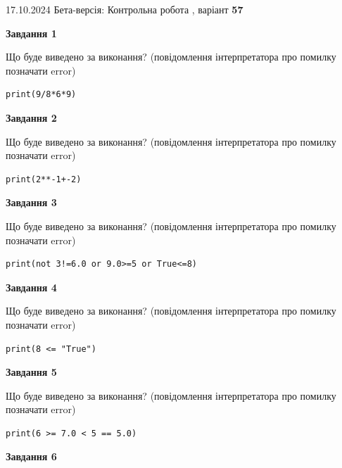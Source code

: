 \documentclass[12pt, ukrainian]{article}
\begin{document}
{\Large{17.10.2024 Бета-версія: Контрольна робота , варіант  \No \textbf { 57 }\par}}
{
\begin {large}
{\begin {center}\textbf{Завдання 1}\end {center}}

Що буде виведено за виконання? (повідомлення інтерпретатора про помилку позначати error)\par
\begin{verbatim}
print(9/8*6*9)
\end{verbatim}

{\begin {center}\textbf{Завдання 2}\end {center}}

Що буде виведено за виконання? (повідомлення інтерпретатора про помилку позначати error)\par
\begin{verbatim}
print(2**-1+-2)
\end{verbatim}

{\begin {center}\textbf{Завдання 3}\end {center}}

Що буде виведено за виконання? (повідомлення інтерпретатора про помилку позначати error)\par
\begin{verbatim}
print(not 3!=6.0 or 9.0>=5 or True<=8)
\end{verbatim}

{\begin {center}\textbf{Завдання 4}\end {center}}

Що буде виведено за виконання? (повідомлення інтерпретатора про помилку позначати error)\par
\begin{verbatim}
print(8 <= "True")
\end{verbatim}

{\begin {center}\textbf{Завдання 5}\end {center}}

Що буде виведено за виконання? (повідомлення інтерпретатора про помилку позначати error)\par
\begin{verbatim}
print(6 >= 7.0 < 5 == 5.0)
\end{verbatim}

{\begin {center}\textbf{Завдання 6}\end {center}}


\end{large}}
\end{document}
